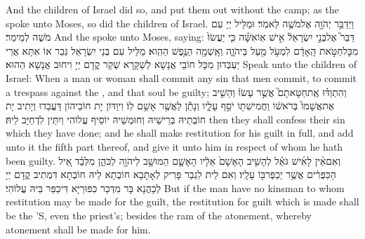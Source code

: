 {And the children of Israel did so, and put them out without the camp; as the \lord\space spoke unto Moses, so did the children of Israel.}{}
{וַיְדַבֵּ֥ר יְהֹוָ֖ה אֶל\maqqaf מֹשֶׁ֥ה לֵּאמֹֽר׃}
{וּמַלֵּיל יְיָ עִם מֹשֶׁה לְמֵימַר׃}
{And the \lord\space spoke unto Moses, saying:}{}
{דַּבֵּר֮ אֶל\maqqaf בְּנֵ֣י יִשְׂרָאֵל֒ אִ֣ישׁ אֽוֹ\maqqaf אִשָּׁ֗ה כִּ֤י יַעֲשׂוּ֙ מִכׇּל\maqqaf חַטֹּ֣את הָֽאָדָ֔ם לִמְעֹ֥ל מַ֖עַל בַּיהֹוָ֑ה וְאָֽשְׁמָ֖ה הַנֶּ֥פֶשׁ הַהִֽוא׃}
{מַלֵּיל עִם בְּנֵי יִשְׂרָאֵל גְּבַר אוֹ אִתָּא אֲרֵי יַעְבְּדוּן מִכָּל חוֹבֵי אֲנָשָׁא לְשַׁקָּרָא שְׁקַר קֳדָם יְיָ וִיחוּב אֲנָשָׁא הַהוּא׃}
{Speak unto the children of Israel: When a man or woman shall commit any sin that men commit, to commit a trespass against the \lord, and that soul be guilty;}{}
{וְהִתְוַדּ֗וּ אֶֽת\maqqaf חַטָּאתָם֮ אֲשֶׁ֣ר עָשׂוּ֒ וְהֵשִׁ֤יב אֶת\maqqaf אֲשָׁמוֹ֙ בְּרֹאשׁ֔וֹ וַחֲמִישִׁת֖וֹ יֹסֵ֣ף עָלָ֑יו וְנָתַ֕ן לַאֲשֶׁ֖ר אָשַׁ֥ם לֽוֹ׃}
{וִיוַדּוֹן יָת חוֹבֵיהוֹן דַּעֲבַדוּ וְיָתִיב יָת חוֹבְתֵיהּ בְּרֵישֵׁיהּ וְחוּמְשֵׁיהּ יוֹסֵיף עֲלוֹהִי וְיִתֵּין לִדְחַיָּב לֵיהּ׃}
{then they shall confess their sin which they have done; and he shall make restitution for his guilt in full, and add unto it the fifth part thereof, and give it unto him in respect of whom he hath been guilty.}{}
{וְאִם\maqqaf אֵ֨ין לָאִ֜ישׁ גֹּאֵ֗ל לְהָשִׁ֤יב הָאָשָׁם֙ אֵלָ֔יו הָאָשָׁ֛ם הַמּוּשָׁ֥ב לַיהֹוָ֖ה לַכֹּהֵ֑ן מִלְּבַ֗ד אֵ֚יל הַכִּפֻּרִ֔ים אֲשֶׁ֥ר יְכַפֶּר\maqqaf בּ֖וֹ עָלָֽיו׃}
{וְאִם לֵית לִגְבַר פָּרִיק לְאָתָבָא חוֹבְתָא לֵיהּ חוֹבְתָא דִּמְתִיב קֳדָם יְיָ לְכָהֲנָא בָּר מִדְּכַר כִּפּוּרַיָּא דִּיכַפַּר בֵּיהּ עֲלוֹהִי׃}
{But if the man have no kinsman to whom restitution may be made for the guilt, the restitution for guilt which is made shall be the \lord’S, even the priest’s; besides the ram of the atonement, whereby atonement shall be made for him.}{}
